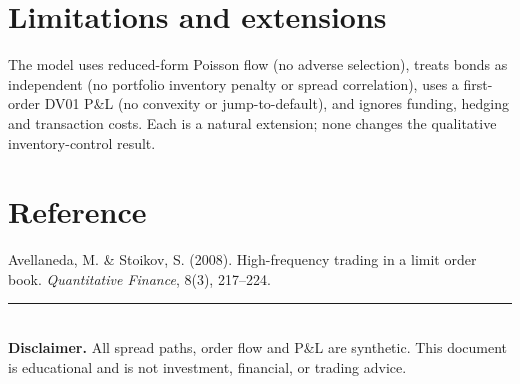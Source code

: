 \documentclass[11pt]{article}
\theoremstyle{definition}
\theoremstyle{plain}
\begin{document}
\section{Limitations and extensions}
\label{sec:limits}
The model uses reduced-form Poisson flow (no adverse selection), treats bonds as
independent (no portfolio inventory penalty or spread correlation), uses a
first-order DV01 P\&L (no convexity or jump-to-default), and ignores funding,
hedging and transaction costs. Each is a natural extension; none changes the
qualitative inventory-control result.

\section*{Reference}
\small
Avellaneda, M. \& Stoikov, S. (2008). High-frequency trading in a limit order
book. \emph{Quantitative Finance}, 8(3), 217--224.

\vfill
\noindent\rule{\linewidth}{0.4pt}\\
{\footnotesize\textbf{Disclaimer.} All spread paths, order flow and P\&L are
synthetic. This document is educational and is not investment, financial, or
trading advice.}
\end{document}
